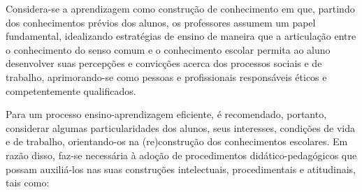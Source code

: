 Considera-se a aprendizagem como construção de conhecimento em que, partindo dos conhecimentos prévios dos alunos, os professores assumem um papel fundamental, idealizando estratégias de ensino de maneira que a articulação entre o conhecimento do senso comum e o conhecimento escolar permita ao aluno desenvolver suas percepções e convicções acerca dos processos sociais e de trabalho, aprimorando-se como pessoas e profissionais responsáveis éticos e competentemente qualificados.

Para um processo ensino-aprendizagem eficiente, é recomendado, portanto, considerar algumas particularidades dos alunos, seus interesses, condições de vida e de trabalho, orientando-os na (re)construção dos conhecimentos escolares. Em razão disso, faz-se necessária à adoção de procedimentos didático-pedagógicos que possam auxiliá-los nas suas construções intelectuais, procedimentais e atitudinais, tais como:

